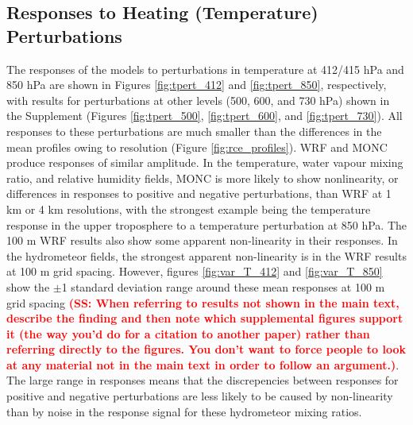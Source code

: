 \documentclass[draft]{agujournal2019}
\newcommand{\todo}[1]{\textcolor{red}{\textbf{(#1)}}}
\begin{document}
\subsection{Responses to Heating (Temperature) Perturbations}

The responses of the models to perturbations in temperature at 412/415 hPa and 850 hPa are shown in Figures \ref{fig:tpert_412} and
\ref{fig:tpert_850}, respectively, with results for perturbations at other levels (500, 600, and 730
hPa) shown in the Supplement (Figures \ref{fig:tpert_500}, \ref{fig:tpert_600}, and
\ref{fig:tpert_730}). All
responses to these perturbations are much smaller than the differences in the mean
profiles owing to resolution (Figure \ref{fig:rce_profiles}). WRF and MONC
produce responses of similar amplitude. In the temperature, water vapour mixing
ratio, and relative humidity fields, MONC is more likely to show nonlinearity,
or differences in responses to positive and negative perturbations, than WRF at
1 km or 4 km resolutions, with the strongest example being the temperature
response in the upper troposphere to a temperature perturbation at 850 hPa. The
100 m WRF results also show some apparent non-linearity in their responses. In
the hydrometeor fields, the strongest apparent non-linearity is in the WRF
results at 100 m grid spacing. However, figures \ref{fig:var_T_412} and
\ref{fig:var_T_850} show the $\pm$1 standard deviation range around these mean
responses at 100 m grid spacing \todo{SS: When referring to results not shown in the main text, describe the finding and then note which supplemental figures support it (the way you'd do for a citation to another paper) rather than referring directly to the figures.  You don't want to force people to look at any material not in the main text in order to follow an argument.}. The large range in responses means that the
discrepencies between responses for positive and negative perturbations are less
likely to be caused by non-linearity than by noise in the response signal for
these hydrometeor mixing ratios.
\end{document}
